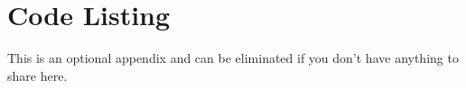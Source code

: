 \chapter{Code Listing}

This is an optional appendix and can be eliminated if you don't have anything 
to share here.

